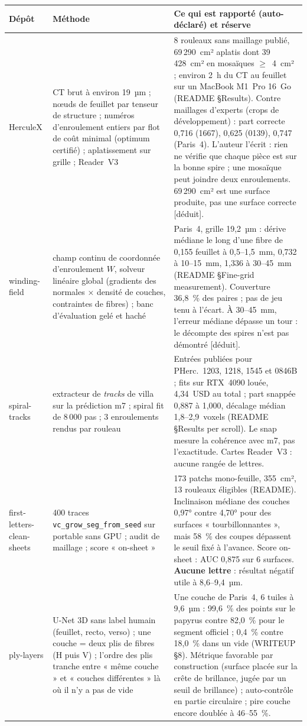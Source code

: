 \documentclass[11pt,a4paper]{article}
\newcommand{\deduit}{\textsf{\small[déduit]}}
\newcommand{\pherc}[1]{PHerc.~#1}
\begin{document}
\begin{longtable}{@{}p{2.7cm}p{4.2cm}p{7.9cm}@{}}
\toprule
Dépôt & Méthode & Ce qui est rapporté (auto-déclaré) et réserve \\
\midrule
\endhead
HerculeX \cite{betka2026} & CT brut à environ 19~µm ; nœuds de feuillet par tenseur de structure ; numéros d'enroulement entiers par flot de coût minimal (optimum certifié) ; aplatissement sur grille ; Reader~V3 & 8 rouleaux sans maillage publié, 69\,290~cm² aplatis dont 39\,428~cm² en mosaïques $\ge$~4~cm² ; environ 2~h du CT au feuillet sur un MacBook M1~Pro 16~Go (README §Results). Contre maillages d'experts (crops de développement) : part correcte 0,716 (1667), 0,625 (0139), 0,747 (Paris~4). L'auteur l'écrit : rien ne vérifie que chaque pièce est sur la bonne spire ; une mosaïque peut joindre deux enroulements. 69\,290~cm² est une surface produite, pas une surface correcte \deduit. \\
winding-field \cite{limegs2026winding} & champ continu de coordonnée d'enroulement $W$, solveur linéaire global (gradients des normales × densité de couches, contraintes de fibres) ; banc d'évaluation gelé et haché & Paris~4, grille 19,2~µm : dérive médiane le long d'une fibre de 0,155 feuillet à 0,5–1,5~mm, 0,732 à 10–15~mm, 1,336 à 30–45~mm (README §Fine-grid measurement). Couverture 36,8~\% des paires ; pas de jeu tenu à l'écart. À 30–45~mm, l'erreur médiane dépasse un tour : le décompte des spires n'est pas démontré \deduit. \\
spiral-tracks \cite{gilman2026spiral} & extracteur de \emph{tracks} de villa sur la prédiction m7 ; spiral fit de 8\,000 pas ; 3 enroulements rendus par rouleau & Entrées publiées pour \pherc{1203}, 1218, 1545 et 0846B ; fits sur RTX~4090 louée, 4,34~USD au total ; part snappée 0,887 à 1,000, décalage médian 1,8–2,9~voxels (README §Results per scroll). Le snap mesure la cohérence avec m7, pas l'exactitude. Cartes Reader~V3 : aucune rangée de lettres. \\
first-letters-clean-sheets \cite{gilman2026sheets} & 400 traces \texttt{vc\_grow\_seg\_from\_seed} sur portable sans GPU ; audit de maillage ; score « on-sheet » & 173 patchs mono-feuille, 355~cm², 13 rouleaux éligibles (README). Inclinaison médiane des couches 0,97° contre 4,70° pour des surfaces « tourbillonnantes », mais 58~\% des coupes dépassent le seuil fixé à l'avance. Score on-sheet : AUC 0,875 sur 6 surfaces. \textbf{Aucune lettre} : résultat négatif utile à 8,6–9,4~µm. \\
ply-layers \cite{devore2026} & U-Net 3D sans label humain (feuillet, recto, verso) ; une couche = deux plis de fibres (H puis V) ; l'ordre des plis tranche entre « même couche » et « couches différentes » là où il n'y a pas de vide & Une couche de Paris~4, 6 tuiles à 9,6~µm : 99,6~\% des points sur le papyrus contre 82,0~\% pour le segment officiel ; 0,4~\% contre 18,0~\% dans un vide (WRITEUP §8). Métrique favorable par construction (surface placée sur la crête de brillance, jugée par un seuil de brillance) ; auto-contrôle en partie circulaire ; pire couche encore doublée à 46–55~\%. \\

\end{longtable}
\end{document}
